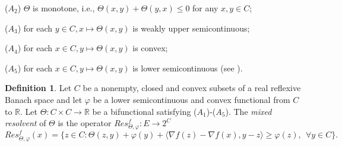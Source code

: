 \documentclass[reqno,b5paper]{amsart}
\theoremstyle{plain}
\theoremstyle{definition}
\newtheorem{definition}[theorem]{Definition}
\numberwithin{equation}{section}
\numberwithin{equation}{section}
\begin{document}
($A_{2}$) $\Theta$ is monotone, i.e., $\Theta (x,y)+\Theta (y,x)\leq0$ for any $x,y\in C$;

($A_{3}$) for each $y\in C, x\mapsto \Theta (x,y)$ is weakly upper semicontinuous;

($A_{4}$) for each $x\in C, y\mapsto \Theta (x,y)$ is convex;

($A_{5}$) for each $x\in C, y\mapsto \Theta (x,y)$ is lower semicontinuous (see \cite{pen}).

\begin{definition}
Let $C$ be a nonempty, closed and convex subsets of a real reflexive Banach space and let $\varphi$ be a lower semicontinuous and convex functional from $C$ to $\mathbb{R}$. Let $\Theta: C\times C\to\mathbb{R}$ be a bifunctional satisfying ($A_{1}$)-($A_{5}$). The \textit{mixed resolvent} of $\Theta$ is the operator $Res_{\Theta,\varphi}^{f}:E\to 2^{C}$ 
\begin{equation}
Res_{\Theta,\varphi}^{f}(x)=\{z\in C: \Theta (z,y)+\varphi(y)+\langle \nabla f(z)-\nabla f(x),y-z\rangle \geq \varphi(z), \ \ \forall y\in C\}.
\end{equation}
\end{definition}
\end{document}
